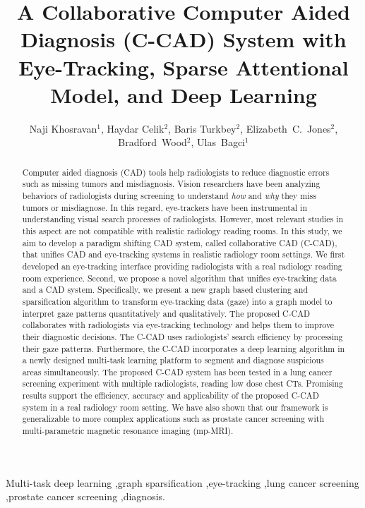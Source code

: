 \documentclass[preprint,12pt]{elsarticle}
\begin{document}
\begin{frontmatter}


\title{A Collaborative Computer Aided Diagnosis (C-CAD) System with Eye-Tracking, Sparse Attentional Model, and Deep Learning}


\author{Naji Khosravan$^1$, Haydar Celik$^2$, Baris Turkbey$^2$, Elizabeth~C.~Jones$^2$, Bradford~Wood$^2$, Ulas~Bagci$^1$}
 \address{$^1$Center for Research in Computer Vision, University of Central Florida, FL.\\
 $^2$Clinical Center, National Institutes of Health, Bethesda, MD.}








\begin{abstract}
Computer aided diagnosis (CAD) tools help radiologists to reduce diagnostic errors such as missing tumors and misdiagnosis. Vision researchers have been analyzing behaviors of radiologists during screening to understand \textit{how} and \textit{why} they miss tumors or misdiagnose. In this regard, eye-trackers have been instrumental in understanding visual search processes of radiologists. However, most relevant studies in this aspect are not compatible with realistic radiology reading rooms. In this study, we aim to develop a paradigm shifting CAD system, called collaborative CAD (C-CAD), that unifies CAD and eye-tracking systems in realistic radiology room settings. We first developed an eye-tracking interface providing radiologists with a real radiology reading room experience. Second, we propose a novel algorithm that unifies eye-tracking data and a CAD system. Specifically, we present a new graph based clustering and sparsification algorithm to transform eye-tracking data (gaze) into a graph model to interpret gaze patterns quantitatively and qualitatively. The proposed C-CAD collaborates with radiologists via eye-tracking technology and helps them to improve their diagnostic decisions. The C-CAD uses radiologists' search efficiency by processing their gaze patterns. Furthermore, the C-CAD incorporates a deep learning algorithm in a newly designed multi-task learning platform to segment and diagnose suspicious areas simultaneously. The proposed C-CAD system has been tested in a lung cancer screening experiment with multiple radiologists, reading low dose chest CTs. Promising results support the efficiency, accuracy and applicability of the proposed C-CAD system in a real radiology room setting.  We have also shown that our framework is generalizable to more complex applications such as prostate cancer screening with multi-parametric magnetic resonance imaging (mp-MRI).
\end{abstract}


\begin{keyword}
Multi-task deep learning \sep graph sparsification \sep eye-tracking \sep  lung cancer screening \sep prostate cancer screening  \sep diagnosis.
\end{keyword}


\end{frontmatter}
\end{document}
